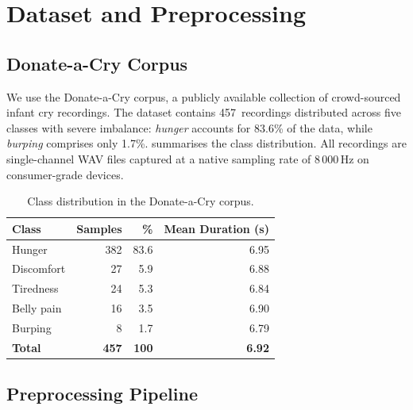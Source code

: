\documentclass[conference]{IEEEtran}
\begin{document}
\section{Dataset and Preprocessing}
\label{sec:dataset}

\subsection{Donate-a-Cry Corpus}
\label{sec:corpus}

We use the Donate-a-Cry corpus, a publicly available collection of
crowd-sourced infant cry recordings.  The dataset contains
457~recordings distributed across five classes with severe imbalance:
\textit{hunger} accounts for 83.6\% of the data, while \textit{burping}
comprises only 1.7\%.   summarises the class
distribution.  All recordings are single-channel WAV files captured at a
native sampling rate of 8\,000\,Hz on consumer-grade devices.

\begin{table}[t]
  \centering
  \caption{Class distribution in the Donate-a-Cry corpus.}
  \label{tab:class_dist}
  \begin{tabular}{lrrr}
    \toprule
    \textbf{Class} & \textbf{Samples} & \textbf{\%} & \textbf{Mean Duration (s)} \\
    \midrule
    Hunger     & 382 & 83.6 & 6.95 \\
    Discomfort &  27 &  5.9 & 6.88 \\
    Tiredness  &  24 &  5.3 & 6.84 \\
    Belly pain &  16 &  3.5 & 6.90 \\
    Burping    &   8 &  1.7 & 6.79 \\
    \midrule
    \textbf{Total} & \textbf{457} & \textbf{100} & \textbf{6.92} \\
    \bottomrule
  \end{tabular}
\end{table}

\subsection{Preprocessing Pipeline}
\label{sec:preprocess}
\end{document}
